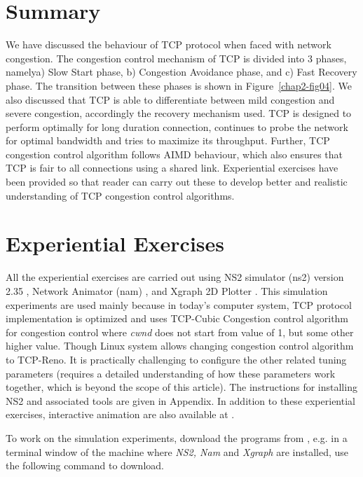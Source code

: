 \begin{multicols}{2}
\section{Summary}

We have discussed the behaviour of TCP protocol when faced with network congestion. The congestion control mechanism of TCP is divided into 3 phases, namely\break a) Slow Start phase, b) Congestion Avoidance phase, and c) Fast Recovery phase. The transition between these phases is shown in Figure~\ref{chap2-fig04}. We also discussed that TCP is able to differentiate between mild congestion and severe congestion, accordingly  the recovery mechanism used. TCP is designed to perform optimally for long duration connection, continues to probe the network for optimal bandwidth and tries to maximize its throughput. Further, TCP congestion control algorithm follows AIMD behaviour, which also ensures that TCP is fair to all connections using a shared link. Experiential exercises have been provided so that reader can carry out these to develop better and realistic understanding of TCP congestion control algorithms.

\section{Experiential Exercises}

All the experiential exercises are carried out using NS2 simulator (ns2) version 2.35 \cite{art2-key09}, Network Animator (nam) \cite{art2-key10}, and Xgraph 2D Plotter \cite{art2-key11}. This simulation experiments are used mainly because in today’s computer system, TCP protocol implementation is optimized and uses TCP-Cubic Congestion control algorithm for congestion control where \textit{cwnd} does not start from value of 1, but some other higher value. Though Linux system allows changing congestion control algorithm to TCP-Reno. It is practically challenging to configure the other related tuning parameters (requires a detailed understanding of how these parameters work together, which is beyond the scope of this article). The instructions for installing NS2 and associated tools are given in Appendix. In addition to these experiential exercises, interactive animation are also available at \cite{art2-key14}.

To work on the simulation experiments, download the programs from \cite{art2-key12}, e.g. in a terminal window of the machine where \textit{NS2, Nam} and \textit{Xgraph} are installed, use the following command to download.
 

\end{multicols}

